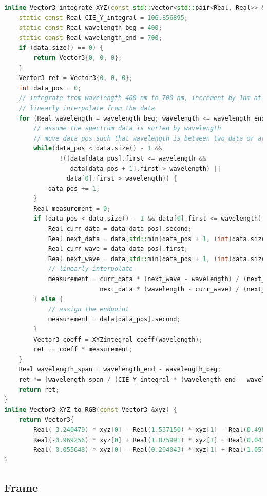 \documentclass{article}
\begin{document}
\begin{lstlisting}[language=c++]
inline Vector3 integrate_XYZ(const std::vector<std::pair<Real, Real>> &data) {
    static const Real CIE_Y_integral = 106.856895;
    static const Real wavelength_beg = 400;
    static const Real wavelength_end = 700;
    if (data.size() == 0) {
        return Vector3{0, 0, 0};
    }
    Vector3 ret = Vector3{0, 0, 0};
    int data_pos = 0;
    // integrate from wavelength 400 nm to 700 nm, increment by 1nm at a time
    // linearly interpolate from the data
    for (Real wavelength = wavelength_beg; wavelength <= wavelength_end; wavelength += Real(1)) {
        // assume the spectrum data is sorted by wavelength
        // move data_pos such that wavelength is between two data or at one end
        while(data_pos < data.size() - 1 &&
               !((data[data_pos].first <= wavelength &&
                  data[data_pos + 1].first > wavelength) ||
                 data[0].first > wavelength)) {
            data_pos += 1;
        }
        Real measurement = 0;
        if (data_pos < data.size() - 1 && data[0].first <= wavelength) {
            Real curr_data = data[data_pos].second;
            Real next_data = data[std::min(data_pos + 1, (int)data.size() - 1)].second;
            Real curr_wave = data[data_pos].first;
            Real next_wave = data[std::min(data_pos + 1, (int)data.size() - 1)].first;
            // linearly interpolate
            measurement = curr_data * (next_wave - wavelength) / (next_wave - curr_wave) +
                          next_data * (wavelength - curr_wave) / (next_wave - curr_wave);
        } else {
            // assign the endpoint
            measurement = data[data_pos].second;
        }
        Vector3 coeff = XYZintegral_coeff(wavelength);
        ret += coeff * measurement;
    }
    Real wavelength_span = wavelength_end - wavelength_beg;
    ret *= (wavelength_span / (CIE_Y_integral * (wavelength_end - wavelength_beg)));
    return ret;
}
inline Vector3 XYZ_to_RGB(const Vector3 &xyz) {
    return Vector3{
        Real( 3.240479) * xyz[0] - Real(1.537150) * xyz[1] - Real(0.498535) * xyz[2],
        Real(-0.969256) * xyz[0] + Real(1.875991) * xyz[1] + Real(0.041556) * xyz[2],
        Real( 0.055648) * xyz[0] - Real(0.204043) * xyz[1] + Real(1.057311) * xyz[2]};
}
\end{lstlisting}

\subsection{Frame}
\end{document}
